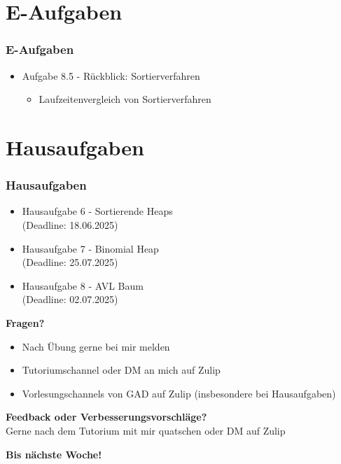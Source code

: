 \documentclass{beamer}
\begin{document}
\section{E-Aufgaben}
\begin{frame}
	\frametitle{E-Aufgaben}
	\begin{itemize}
		\item Aufgabe 8.5 - Rückblick: Sortierverfahren \\
		      \begin{itemize}
			      \item Laufzeitenvergleich von Sortierverfahren
		      \end{itemize}
	\end{itemize}
\end{frame}

\section{Hausaufgaben}
\begin{frame}
	\frametitle{Hausaufgaben}
	\begin{itemize}
		\item Hausaufgabe 6 - Sortierende Heaps \\
		      (Deadline: 18.06.2025)
		\item Hausaufgabe 7 - Binomial Heap \\
		      (Deadline: 25.07.2025)
		\item Hausaufgabe 8 - AVL Baum \\
		      (Deadline: 02.07.2025)
	\end{itemize}
\end{frame}

\begin{frame}
	\textbf{Fragen?}
	\begin{itemize}
		\item Nach Übung gerne bei mir melden
		\item Tutoriumschannel oder DM an mich auf Zulip
		\item Vorlesungschannels von GAD auf Zulip (insbesondere bei Hausaufgaben)
	\end{itemize}

	\medskip
	\textbf{Feedback oder Verbesserungsvorschläge?} \\
	Gerne nach dem Tutorium mit mir quatschen oder DM auf Zulip

	\medskip
	\textbf{Bis nächste Woche!}
\end{frame}

\end{document}
